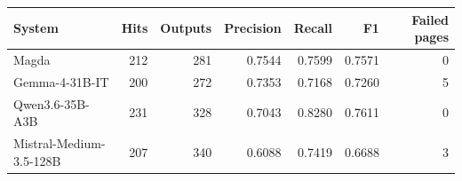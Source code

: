 \begin{tabular}{@{}lrrrrrr@{}}
\toprule
System & Hits & Outputs & Precision & Recall & F1 & Failed pages \\
\midrule
Magda & 212 & 281 & 0.7544 & 0.7599 & 0.7571 & 0 \\
Gemma-4-31B-IT & 200 & 272 & 0.7353 & 0.7168 & 0.7260 & 5 \\
Qwen3.6-35B-A3B & 231 & 328 & 0.7043 & 0.8280 & 0.7611 & 0 \\
Mistral-Medium-3.5-128B & 207 & 340 & 0.6088 & 0.7419 & 0.6688 & 3 \\
\bottomrule
\end{tabular}
